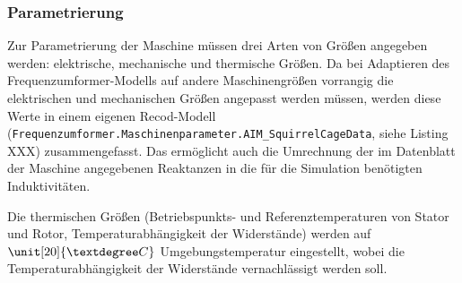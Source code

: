 \hypertarget{parametrierung}{%
\subsubsection{Parametrierung}\label{parametrierung}}

Zur Parametrierung der Maschine müssen drei Arten von Größen angegeben
werden: elektrische, mechanische und thermische Größen. Da bei
Adaptieren des Frequenzumformer-Modells auf andere Maschinengrößen
vorrangig die elektrischen und mechanischen Größen angepasst werden
müssen, werden diese Werte in einem eigenen Recod-Modell
(\texttt{Frequenzumformer.Maschinenparameter.AIM\_SquirrelCageData},
siehe Listing XXX) zusammengefasst. Das ermöglicht auch die Umrechnung
der im Datenblatt der Maschine angegebenen Reaktanzen in die für die
Simulation benötigten Induktivitäten.

Die thermischen Größen (Betriebspunkts- und Referenztemperaturen von
Stator und Rotor, Temperaturabhängigkeit der Widerstände) werden auf
\(\unit[20]{°C}\) Umgebungstemperatur eingestellt, wobei die
Temperaturabhängigkeit der Widerstände vernachlässigt werden soll.

